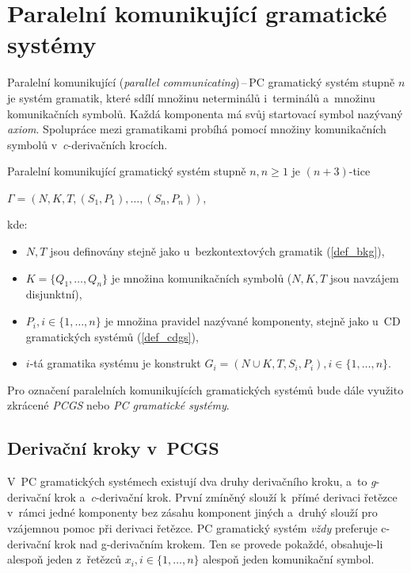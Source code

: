 \section{Paralelní komunikující gramatické systémy}
Paralelní komunikující (\emph{parallel communicating})\,--\,PC gramatický systém stupně $n$ je systém gramatik, které sdílí množinu neterminálů i~terminálů a~množinu komunikačních symbolů.
Každá komponenta má svůj startovací symbol nazývaný \emph{axiom}.
Spolupráce mezi gramatikami probíhá pomocí množiny komunikačních symbolů v~\emph{c}-derivačních krocích.
\begin{definition}
    Paralelní komunikující gramatický systém stupně $n, n \geq 1$ je $(n+3)$-tice
    \begin{center}
        $\Gamma = (N, K, T, (S_1, P_1), \ldots, (S_n, P_n))$,
    \end{center}
    kde:
    \begin{itemize}
        \item $N, T$ jsou definovány stejně jako u~bezkontextových gramatik (\ref{def_bkg}),
        \item $K = \{Q_1, \ldots, Q_n\}$ je množina komunikačních symbolů ($N, K, T$ jsou navzájem disjunktní),
        \item $P_i, i \in \{1, \ldots, n\}$ je množina pravidel nazývané komponenty, stejně jako u~CD gramatických systémů (\ref{def_cdgs}),
        \item $i$-tá gramatika systému je konstrukt $G_i = (N \cup K, T, S_i, P_i), i \in \{1, \ldots, n\}$.
    \end{itemize}
\end{definition}

\begin{convention}
Pro označení paralelních komunikujících gramatických systémů bude dále využito zkrácené \emph{PCGS} nebo \emph{PC gramatické systémy}.
\end{convention}

\subsection*{Derivační kroky v~PCGS}

V~PC gramatických systémech existují dva druhy derivačního kroku, a~to \emph{g}-derivační krok a~\emph{c}-derivační krok.
První zmíněný slouží k~přímé derivaci řetězce v~rámci jedné komponenty bez zásahu komponent jiných a~druhý slouží pro vzájemnou pomoc při derivaci řetězce. 
PC gramatický systém \emph{vždy} preferuje c-derivační krok nad g-derivačním krokem.
Ten se provede pokaždé, obsahuje-li alespoň jeden z~řetězců $x_i, i \in \{1, \ldots, n\}$ alespoň jeden komunikační symbol.

